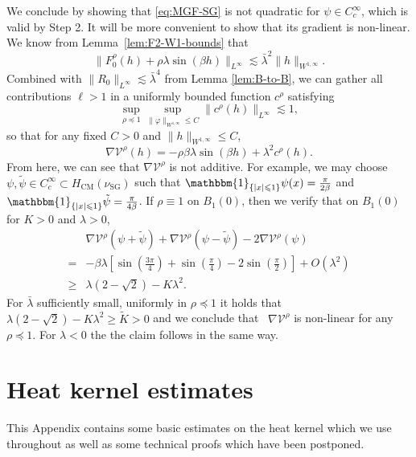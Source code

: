 \documentclass[11pt, a4paper]{scrartcl}
\numberwithin{equation}{section}
\theoremstyle{plain}
\theoremstyle{remark}
\newcommand{\tmop}[1]{\ensuremath{\operatorname{#1}}}
\newcommand{\tmtextbf}[1]{\text{{\bfseries{#1}}}}
\begin{document}
\tmtextbf{Step 3.} We conclude by showing that \eqref{eq:MGF-SG} is not
quadratic for $\psi\in C^\infty_c$, which is valid by Step 2.
It will be more convenient to show that its
gradient is non-linear. 
We know from Lemma~\ref{lem:F2-W1-bounds} that
\[
  \| F_0^{\rho} (h) + \rho\lambda\sin(\beta h)\|_{L^{\infty}} 
  \lesssim \bar{\lambda}^2 \| h \|_{W^{1, \infty}}.
\]
Combined with $\|
R_0 \|_{L^{\infty}} \lesssim \bar{\lambda}^4$ from Lemma \ref{lem:B-to-B}, we can
gather all contributions $\ell > 1$ in a uniformly bounded function $c^{\rho}$
satisfying
\[ \sup_{\rho \preceq  1} \sup_{\| \varphi \|_{W^{1, \infty}} \leqslant C}
   \| c^{\rho} (h) \|_{L^{\infty}} \lesssim 1, \]
so that for any fixed $C > 0$ and $\| h \|_{W^{1, \infty}} \leqslant C$,
\[ \nabla \mathcal{V}^{\rho} (h) = - \rho \beta \lambda \sin (\beta h) +
   \lambda^2 c^{\rho} (h) . \]
From here, we can see that $\nabla \mathcal{V}^{\rho}$ is not additive. For
example, we may choose $\psi, \tilde{\psi} \in C^{\infty}_c \subset
H_{\tmop{CM}} (\nu_{\tmop{SG}})$ such that $\mathbbm{1}_{\{ | x | \leqslant 1
\}} \psi (x) = \frac{\pi}{2 \beta}$ and $\mathbbm{1}_{\{ | x | \leqslant 1 \}}
\tilde{\psi} = \frac{\pi}{4 \beta}$. If $\rho \equiv 1$ on
$B_1 (0)$, then we verify that on $B_1 (0)$ for $K > 0$ and $\lambda>0$,
\begin{align}
     &\nabla \mathcal{V}^{\rho} (\psi + \tilde{\psi}) + \nabla
     \mathcal{V}^{\rho} (\psi - \tilde{\psi}) - 2 \nabla \mathcal{V}^{\rho}
     (\psi) \\ 
     = & -\beta \lambda \left[ \sin \left( \frac{3 \pi}{4} \right) +
     \sin \left( \frac{\pi}{4} \right) - 2 \sin \left( \frac{\pi}{2} \right)
     \right] + O (\lambda^2)\\
     \geqslant & \lambda \left( 2 - \sqrt{2} \right) - K \lambda^2 .
   \end{align}
For $\bar{\lambda}$ sufficiently small, uniformly in $\rho \preceq  1$ it holds
that $\lambda \left(2 - \sqrt{2} \right) - K \lambda^2 \geqslant \tilde{K} >
0$ and we conclude that \ $\nabla \mathcal{V}^{\rho}$ is non-linear for any
$\rho \preceq  1$. For $\lambda<0$ the the claim follows in the same way.


\appendix\section{Heat kernel estimates}\label{app:hk}

This Appendix contains some basic estimates on the heat kernel which we use
throughout as well as some technical proofs which have been postponed.
\end{document}
